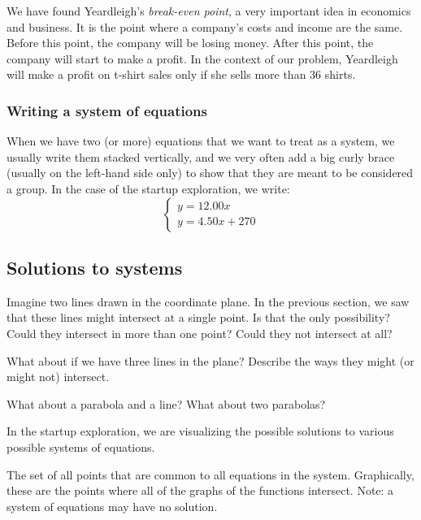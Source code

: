 We have found Yeardleigh's \textit{break-even point}, a very important idea in economics and business. It is the point where a company's costs and income are the same. Before this point, the company will be losing money. After this point, the company will start to make a profit. In the context of our problem, Yeardleigh will make a profit on t-shirt sales only if she sells more than 36 shirts.

\subsubsection{Writing a system of equations}

When we have two (or more) equations that we want to treat as a system, we usually write them stacked vertically, and we very often add a big curly brace (usually on the left-hand side only) to show that they are meant to be considered a group. In the case of the startup exploration, we write: \[\left\{\begin{array}{l}y=12.00x\\y=4.50x+270\end{array}\right.\]

\subsection{Solutions to systems}

\begin{boxexplore}
Imagine two lines drawn in the coordinate plane. In the previous section, we saw that these lines might intersect at a single point. Is that the only possibility? Could they intersect in more than one point? Could they not intersect at all?

What about if we have three lines in the plane? Describe the ways they might (or might not) intersect.

What about a parabola and a line? What about two parabolas?
\end{boxexplore}


In the startup exploration, we are visualizing the possible solutions to various possible systems of equations.

\begin{boxdef}
The set of all points that are common to all equations in the system. Graphically, these are the points where all of the graphs of the functions intersect. Note: a system of equations may have no solution.
\end{boxdef}

